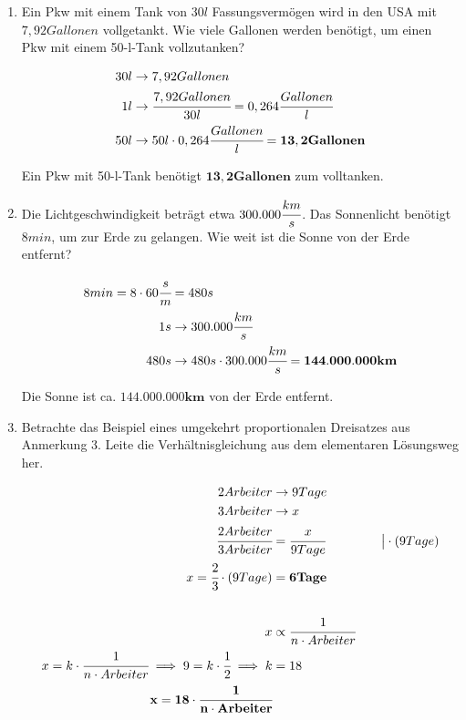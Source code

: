 \documentclass[a4paper,10pt]{article} %
\begin{document}
\begin{enumerate}
    Die Arbeitnehmerin braucht \(\mathbf{25 min}\) um zum Rathaus zu gelangen.

  \item Ein Pkw mit einem Tank von \(30 l\) Fassungsvermögen wird in den USA
    mit \(7,92 Gallonen\) vollgetankt. Wie viele Gallonen werden benötigt,
    um einen Pkw mit einem 50-l-Tank vollzutanken?

    \[
      \begin{aligned}
        30 l &\rightarrow 7,92 Gallonen \\
        1 l &\rightarrow \cfrac{7,92 Gallonen}{30 l} = 0,264 \cfrac{Gallonen}{l} \\
        50 l &\rightarrow 50 l \cdot 0,264 \cfrac{Gallonen}{l} = \mathbf{13,2 Gallonen}
      \end{aligned}
    \]

    Ein Pkw mit 50-l-Tank benötigt \(\mathbf{13,2 Gallonen}\) zum volltanken.

  \item Die Lichtgeschwindigkeit beträgt etwa \(300.000 \cfrac{km}{s}\).
    Das Sonnenlicht benötigt \(8 min\), um zur Erde zu gelangen.
    Wie weit ist die Sonne von der Erde entfernt?

    \[
      \begin{aligned}
        8 min = 8 \cdot 60 \cfrac{s}{m} &= 480 s \\
        1 s &\rightarrow 300.000 \cfrac{km}{s} \\
        480 s &\rightarrow 480 s \cdot 300.000 \cfrac{km}{s} = \mathbf{144.000.000 km}
      \end{aligned}
    \]

    Die Sonne ist ca. \(\mathbf{144.000.000 km}\) von der Erde entfernt.

  \item Betrachte das Beispiel eines umgekehrt proportionalen Dreisatzes aus
    Anmerkung 3. Leite die Verhältnisgleichung aus dem elementaren Lösungsweg her.

    \[
      \begin{aligned}
        2 Arbeiter &\rightarrow 9 Tage \\
        3 Arbeiter &\rightarrow x \\
        \cfrac{2 Arbeiter}{3 Arbeiter} &= \cfrac{x}{9 Tage} &\quad\big| \cdot (9 Tage) \\
        x = \cfrac{2}{3} \cdot (9 Tage) &= \mathbf{6 Tage} \\
        \\
        x &\propto \cfrac{1}{n \cdot Arbeiter} \\
        x = k \cdot \cfrac{1}{n \cdot Arbeiter} \implies 9 = k \cdot \cfrac{1}{2} \implies k &= 18 \\
        \mathbf{x = 18 \cdot \cfrac{1}{n \cdot Arbeiter}} \\
      \end{aligned}
    \]


\end{enumerate}
\end{document}
